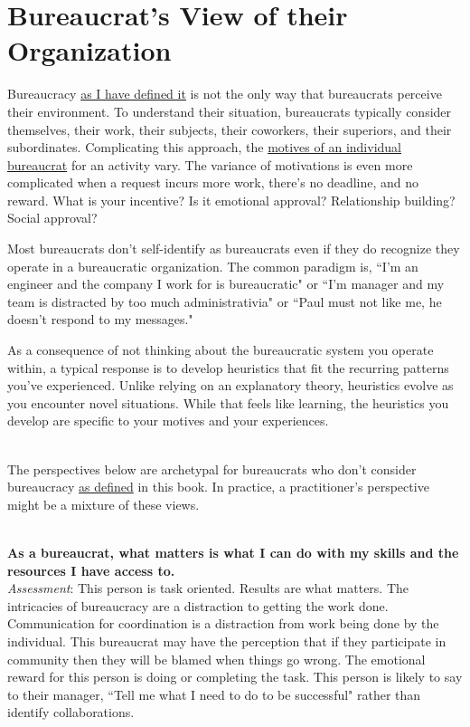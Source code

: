 \section{Bureaucrat's View of their Organization\label{sec:alternative-views-from-within}}

Bureaucracy 
\hyperref[sec:define-bureaucracy]{as I have defined it} 
is not the only way that bureaucrats perceive their environment. To understand their situation, bureaucrats typically consider themselves, their work, their subjects, their coworkers, their superiors, and their subordinates. Complicating this approach, the \hyperref[sec:motivations]{motives of an individual bureaucrat}
for an activity vary.
The variance of motivations is even more complicated when a request incurs more work, there's no deadline, and no reward. What is your incentive? Is it emotional approval? Relationship building? Social approval?

Most bureaucrats don't self-identify as bureaucrats even if they do recognize they operate in a bureaucratic organization. The common paradigm is, ``I'm an engineer and the company I work for is bureaucratic" or ``I'm manager and my team is distracted by too much administrativia" or ``Paul must not like me, he doesn't respond to my messages."

As a consequence of not thinking about the bureaucratic system you operate within, a typical response is to develop heuristics that fit the recurring patterns you've experienced. Unlike relying on an explanatory theory, heuristics evolve as you encounter novel situations. While that feels like learning, the heuristics you develop are specific to your motives and your experiences.

\ \\

The perspectives below are archetypal for bureaucrats who don't consider bureaucracy \hyperref[sec:define-bureaucracy]{as defined} in this book.
In practice, a practitioner's perspective might be a mixture of these views.

\ \\
\textbf{As a bureaucrat, what matters is what I can do with my skills and the resources I have access to.} \\
\textit{Assessment}: This person is task oriented. Results are what matters. The intricacies of bureaucracy are a distraction to getting the work done. 
Communication for coordination is a distraction from work being done by the individual. 
This bureaucrat may have the perception that if they participate in community then they will be blamed when things go wrong.
The emotional reward for this person is doing or completing the task. This person is likely to say to their manager, ``Tell me what I need to do to be successful" rather than identify collaborations.


